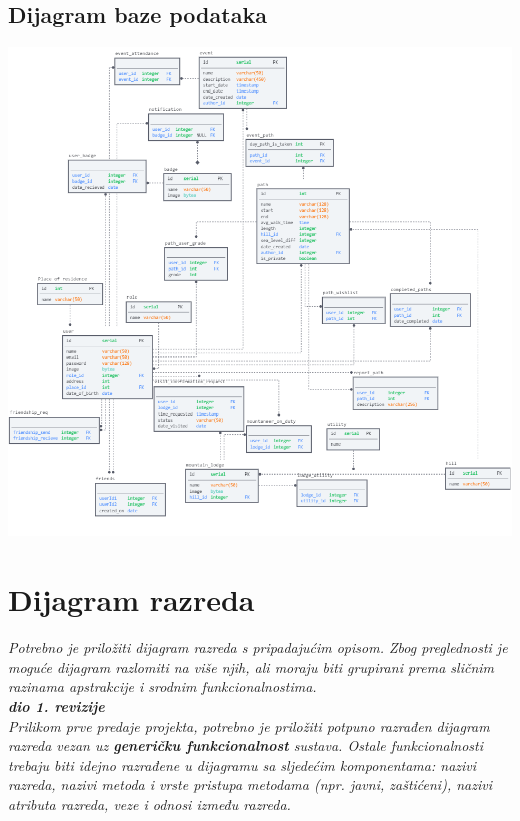 			\subsection{Dijagram baze podataka}
				
				\includegraphics[width=\linewidth]{slike/database.png}
			
			\eject
			
			
		\section{Dijagram razreda}
		
			\textit{Potrebno je priložiti dijagram razreda s pripadajućim opisom. Zbog preglednosti je moguće dijagram razlomiti na više njih, ali moraju biti grupirani prema sličnim razinama apstrakcije i srodnim funkcionalnostima.}\\
			
			\textbf{\textit{dio 1. revizije}}\\
			
			\textit{Prilikom prve predaje projekta, potrebno je priložiti potpuno razrađen dijagram razreda vezan uz \textbf{generičku funkcionalnost} sustava. Ostale funkcionalnosti trebaju biti idejno razrađene u dijagramu sa sljedećim komponentama: nazivi razreda, nazivi metoda i vrste pristupa metodama (npr. javni, zaštićeni), nazivi atributa razreda, veze i odnosi između razreda.}\\
			
